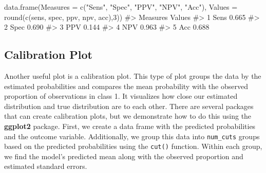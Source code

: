 \documentclass[
  letterpaper,
]{krantz}
\makeatletter
\newenvironment{Shaded}{\begin{snugshade}}{\end{snugshade}}
\newcommand{\AttributeTok}[1]{\textcolor[rgb]{0.40,0.45,0.13}{#1}}
\newcommand{\CommentTok}[1]{\textcolor[rgb]{0.37,0.37,0.37}{#1}}
\newcommand{\DecValTok}[1]{\textcolor[rgb]{0.68,0.00,0.00}{#1}}
\newcommand{\FunctionTok}[1]{\textcolor[rgb]{0.28,0.35,0.67}{#1}}
\newcommand{\NormalTok}[1]{\textcolor[rgb]{0.00,0.23,0.31}{#1}}
\newcommand{\StringTok}[1]{\textcolor[rgb]{0.13,0.47,0.30}{#1}}
\newenvironment{kframe}{%
\medskip{}
\setlength{\fboxsep}{.8em}
 \def\at@end@of@kframe{}%
 \ifinner\ifhmode%
  \def\at@end@of@kframe{\end{minipage}}%
  \begin{minipage}{\columnwidth}%
 \fi\fi%
 \def\FrameCommand##1{\hskip\@totalleftmargin \hskip-\fboxsep
 \colorbox{shadecolor}{##1}\hskip-\fboxsep
     \hskip-\linewidth \hskip-\@totalleftmargin \hskip\columnwidth}%
 \MakeFramed {\advance\hsize-\width
   \@totalleftmargin\z@ \linewidth\hsize
   \@setminipage}}%
 {\par\unskip\endMakeFramed%
 \at@end@of@kframe}
\renewenvironment{Shaded}{\begin{kframe}}{\end{kframe}}
\makeatother
\begin{document}
\begin{Shaded}
\begin{Highlighting}[]
\FunctionTok{data.frame}\NormalTok{(}\AttributeTok{Measures =} \FunctionTok{c}\NormalTok{(}\StringTok{"Sens"}\NormalTok{, }\StringTok{"Spec"}\NormalTok{, }\StringTok{"PPV"}\NormalTok{, }\StringTok{"NPV"}\NormalTok{, }\StringTok{"Acc"}\NormalTok{),}
          \AttributeTok{Values =} \FunctionTok{round}\NormalTok{(}\FunctionTok{c}\NormalTok{(sens, spec, ppv, npv, acc),}\DecValTok{3}\NormalTok{))}
\CommentTok{\#\textgreater{}   Measures Values}
\CommentTok{\#\textgreater{} 1     Sens  0.665}
\CommentTok{\#\textgreater{} 2     Spec  0.690}
\CommentTok{\#\textgreater{} 3      PPV  0.144}
\CommentTok{\#\textgreater{} 4      NPV  0.963}
\CommentTok{\#\textgreater{} 5      Acc  0.688}
\end{Highlighting}
\end{Shaded}

\subsection{Calibration Plot}\label{calibration-plot}

Another useful plot is a calibration plot. This type of plot groups the
data by the estimated probabilities and compares the mean probability
with the observed proportion of observations in class 1. It visualizes
how close our estimated distribution and true distribution are to each
other. There are several packages that can create calibration plots, but
we demonstrate how to do this using the \textbf{ggplot2} package. First,
we create a data frame with the predicted probabilities and the outcome
variable. Additionally, we group this data into \texttt{num\_cuts}
groups based on the predicted probabilities using the \texttt{cut()}
function. Within each group, we find the model's predicted mean along
with the observed proportion and estimated standard errors.
\end{document}
